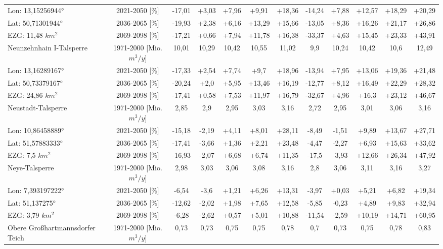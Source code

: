 \begin{longtable}{@{\extracolsep{\fill}}lc|ccccc||ccccc}
\cline{2-12} 
Lon: 13,15256944° & 2021-2050 [\%]  & -17,01 & +3,03 & +7,96 & +9,91 & +18,36 & -14,24 & +7,88 & +12,57 & +18,29 & +20,29\\ 
Lat: 50,71301944° & 2036-2065 [\%]  & -19,93 & +2,38 & +6,16 & +13,29 & +15,66 & -13,05 & +8,36 & +16,26 & +21,17 & +26,86\\ 
EZG: 11,48 $km^2$ & 2069-2098 [\%]  & -17,21 & +0,66 & +7,94 & +11,78 & +16,38 & -33,37 & +4,63 & +15,45 & +23,33 & +43,91\\ 
\hline 
Neunzehnhain I-Talsperre & 1971-2000 [Mio. $m^3/y$]  & 10,01 & 10,29 & 10,42 & 10,55 & 11,02 & 9,9 & 10,24 & 10,42 & 10,6 & 12,49\\ 
\cline{2-12} 
Lon: 13,16289167° & 2021-2050 [\%]  & -17,33 & +2,54 & +7,74 & +9,7 & +18,96 & -13,94 & +7,95 & +13,06 & +19,36 & +21,48\\ 
Lat: 50,73379167° & 2036-2065 [\%]  & -20,24 & +2,0 & +5,95 & +13,46 & +16,19 & -12,77 & +8,12 & +16,49 & +22,29 & +28,32\\ 
EZG: 24,86 $km^2$ & 2069-2098 [\%]  & -17,41 & +0,58 & +7,53 & +11,97 & +16,79 & -32,67 & +4,96 & +16,3 & +23,12 & +46,67\\ 
\hline 
Neustadt-Talsperre & 1971-2000 [Mio. $m^3/y$]  & 2,85 & 2,9 & 2,95 & 3,03 & 3,16 & 2,72 & 2,95 & 3,01 & 3,06 & 3,16\\ 
\cline{2-12} 
Lon: 10,86458889° & 2021-2050 [\%]  & -15,18 & -2,19 & +4,11 & +8,01 & +28,11 & -8,49 & -1,51 & +9,89 & +13,67 & +27,71\\ 
Lat: 51,57883333° & 2036-2065 [\%]  & -17,41 & -3,66 & +1,36 & +2,21 & +23,48 & -4,47 & -2,27 & +6,93 & +15,63 & +33,62\\ 
EZG: 7,5 $km^2$ & 2069-2098 [\%]  & -16,93 & -2,07 & +6,68 & +6,74 & +11,35 & -17,5 & -3,93 & +12,66 & +26,34 & +47,92\\ 
\hline 
Neye-Talsperre & 1971-2000 [Mio. $m^3/y$]  & 2,98 & 3,03 & 3,06 & 3,08 & 3,16 & 2,8 & 3,06 & 3,11 & 3,16 & 3,27\\ 
\cline{2-12} 
Lon: 7,393197222° & 2021-2050 [\%]  & -6,54 & -3,6 & +1,21 & +6,26 & +13,31 & -3,97 & +0,03 & +5,21 & +6,82 & +19,34\\ 
Lat: 51,137275° & 2036-2065 [\%]  & -12,62 & -2,02 & +1,98 & +7,65 & +12,58 & -5,85 & -0,23 & +4,89 & +9,83 & +32,94\\ 
EZG: 3,79 $km^2$ & 2069-2098 [\%]  & -6,28 & -2,62 & +0,57 & +5,01 & +10,88 & -11,54 & -2,59 & +10,19 & +14,71 & +60,95\\ 
\hline 
Obere Großhartmannsdorfer Teich & 1971-2000 [Mio. $m^3/y$]  & 0,73 & 0,73 & 0,75 & 0,75 & 0,78 & 0,7 & 0,73 & 0,75 & 0,78 & 0,83\\ 

\end{longtable}
